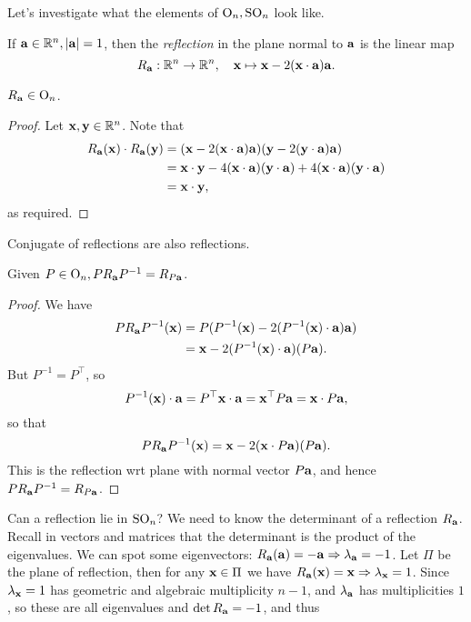 \documentclass[10pt]{article}
\begin{document}
    Let's investigate what the elements of $ \mathrm{O}_n, \mathrm{SO}_n $ look like.
    \begin{definition}
        If $ {\bf a}\in \mathbb{R}^{n}, |{\bf a}|=1 $, then the \textit{reflection} in the plane normal to ${\bf a}$ is the linear map 
        \[
            R_{{\bf a}}:\mathbb{R}^{n}\to \mathbb{R}^{n},\quad {\bf x} \mapsto {\bf x}-2({\bf x} \cdot {\bf a}){\bf a}.
        \]
    \end{definition}
    \begin{proposition}\label{prop:7.15}
        $ R_{\bf a}\in \mathrm{O}_n $.
    \end{proposition}
    \begin{proof}
        Let $ {\bf x},{\bf y}\in \mathbb{R}^{n} $. Note that 
        \begin{align*}
            R_{\bf a}({\bf x})\cdot R_{\bf a}({\bf y}) &= ({\bf x}-2({\bf x} \cdot {\bf a}){\bf a})({\bf y}-2({\bf y} \cdot {\bf a}){\bf a})\\
            &= {\bf x} \cdot {\bf y} - 4({\bf x} \cdot {\bf a})({\bf y} \cdot {\bf a})+4({\bf x} \cdot {\bf a})({\bf y} \cdot {\bf a})\\
            &={\bf x} \cdot {\bf y},
        \end{align*}
        as required.
    \end{proof}
    Conjugate of reflections are also reflections.
    \begin{lemma}\label{lma:7.16}
        Given $ P\in \mathrm{O}_n, PR_{\bf a} P^{-1} = R_{P{\bf a}} $.
    \end{lemma}
    \begin{proof}
        We have
        \begin{align*}
            PR_{\bf a} P^{-1}({\bf x}) &= P(P^{-1}({\bf x})-2(P^{-1}({\bf x}) \cdot {\bf a}){\bf a})\\
            &={\bf x}-2(P^{-1}({\bf x}) \cdot {\bf a})(P{\bf a}).
        \end{align*}
        But $ P^{-1}=P^\top $, so 
        \[
            P^{-1}({\bf x}) \cdot {\bf a} = P^\top {\bf x} \cdot {\bf a} = {\bf x}^\top P {\bf a} = {\bf x} \cdot P{\bf a},
        \]
        so that 
        \[
            PR_{\bf a} P^{-1}({\bf x}) = {\bf x}-2({\bf x} \cdot P{\bf a})(P{\bf a}).
        \]
        This is the reflection wrt plane with normal vector $ P{\bf a} $, and hence $ PR_{\bf a} P^{-1} = R_{P{\bf a}} $.
    \end{proof}
    Can a reflection lie in $ \mathrm{SO}_n $? We need to know the determinant of a reflection $ R_{\bf a} $. Recall in vectors and matrices that the determinant is the product of the eigenvalues. We can spot some eigenvectors: $ R_{\bf a}({\bf a})=-{\bf a} \Rightarrow \lambda_{\bf a}=-1 $. Let $ \Pi $ be the plane of reflection, then for any $ {\bf x}\in \Pi $ we have $ R_{\bf a}({\bf x})={\bf x} \Rightarrow \lambda_{{\bf x}}=1$. Since $ \lambda_{\bf x}=1 $ has geometric and algebraic multiplicity $n-1$, and $ \lambda_{\bf a} $ has multiplicities $1$, so these are all eigenvalues and $ \det R_{\bf a}=-1 $, and thus
\end{document}
